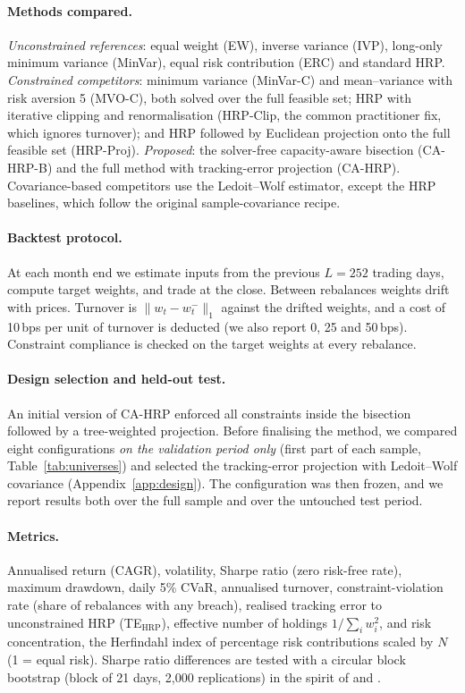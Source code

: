 \paragraph{Methods compared.} \emph{Unconstrained references}: equal weight (EW),
inverse variance (IVP), long-only minimum variance (MinVar), equal risk contribution (ERC)
and standard HRP. \emph{Constrained competitors}: minimum variance (MinVar-C) and
mean--variance with risk aversion 5 (MVO-C), both solved over the full feasible set;
HRP with iterative clipping and renormalisation (HRP-Clip, the common practitioner fix,
which ignores turnover); and HRP followed by Euclidean projection onto the full feasible set
(HRP-Proj). \emph{Proposed}: the solver-free capacity-aware bisection (CA-HRP-B) and the
full method with tracking-error projection (CA-HRP). Covariance-based competitors use the
Ledoit--Wolf estimator, except the HRP baselines, which follow the original sample-covariance
recipe.

\paragraph{Backtest protocol.} At each month end we estimate inputs from the previous
$L=252$ trading days, compute target weights, and trade at the close. Between rebalances
weights drift with prices. Turnover is $\lVert w_t-w_t^-\rVert_1$ against the drifted
weights, and a cost of 10\,bps per unit of turnover is deducted (we also report 0, 25 and
50\,bps). Constraint compliance is checked on the target weights at every rebalance.

\paragraph{Design selection and held-out test.} An initial version of CA-HRP enforced
all constraints inside the bisection followed by a tree-weighted projection. Before
finalising the method, we compared eight configurations \emph{on the validation period
only} (first part of each sample, Table~\ref{tab:universes}) and selected the
tracking-error projection with Ledoit--Wolf covariance (Appendix~\ref{app:design}). The
configuration was then frozen, and we report results both over the full sample and over the
untouched test period.

\paragraph{Metrics.} Annualised return (CAGR), volatility, Sharpe ratio (zero risk-free
rate), maximum drawdown, daily 5\% CVaR, annualised turnover, constraint-violation rate
(share of rebalances with any breach), realised tracking error to unconstrained HRP
(TE$_{\text{HRP}}$), effective number of holdings $1/\sum_i w_i^2$, and risk concentration,
the Herfindahl index of percentage risk contributions scaled by $N$ (1 = equal risk). Sharpe
ratio differences are tested with a circular block bootstrap (block of 21 days, 2{,}000
replications) in the spirit of \citet{ledoit2008} and \citet{politis1994}.
